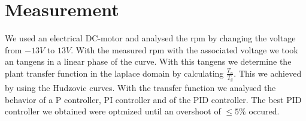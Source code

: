 \section{Measurement}
We used an electrical DC-motor and analysed the rpm by changing the voltage from $-13V$ to $13V$. With the measured rpm with the associated voltage we took an tangens in a linear phase of the curve. With this tangens we determine the plant transfer function in the laplace domain by calculating $\frac{T_{u}}{T_{g}}$. This we achieved by using the Hudzovic curves. With the transfer function we analysed the behavior of a P controller, PI controller and of the PID controller.
The best PID controller we obtained were optmized until an overshoot of $\leq 5 \%$ occured.